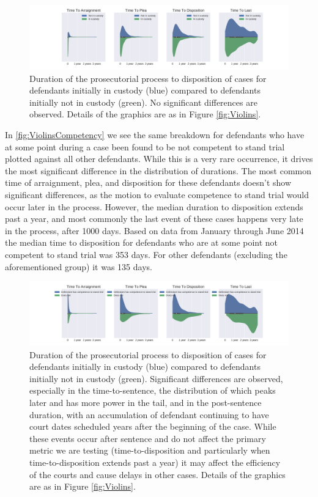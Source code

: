 \documentclass{AISB2008}
\begin{document}
\begin{figure}[h!]
\begin{center}
\includegraphics[width=0.70\columnwidth]{figures/4violins_custody/4violins_custody}
\caption{Duration of the prosecutorial process to disposition of cases for defendants initially in custody (blue) compared to defendants initially not in custody (green). No significant differences are observed. Details of the graphics are as in Figure \ref{fig:Violins}.
\label{fig:ViolinsCustody}%
}
\end{center}
\end{figure}

In \autoref{fig:ViolinsCompetency} we see the same breakdown for
defendants who have at some point during a case been found to be not
competent to stand trial plotted against all other defendants. While
this is a very rare occurrence,
it drives the most significant difference in the distribution of
durations. The most common time of arraignment, plea, and disposition
for these defendants doesn't show significant differences, as the
motion to evaluate competence to stand trial would occur later in the
process.  However, the median duration to disposition extends past a
year, and most commonly the last event of these cases happens very
late in the process, after 1000 days. Based on data from January
through June 2014 the median time to disposition for defendants who
are at some point not competent to stand trial was 353 days. For other
defendants (excluding the aforementioned group) it was 135 days.



\begin{figure}[h!]
\begin{center}
\includegraphics[width=0.70\columnwidth]{figures/4violins_pc1/4violins_pc1}
\caption{Duration of the prosecutorial process to disposition of cases for defendants initially in custody (blue) compared to defendants initially not in custody (green). Significant differences are observed, especially in the time-to-sentence, the distribution of which peaks later and has more power in the tail, and in the post-sentence duration, with an accumulation of defendant continuing to have court dates scheduled years after the beginning of the case. While these events occur after sentence and do not affect the primary metric we are testing (time-to-disposition and particularly when time-to-disposition extends past a year) it may affect the efficiency of the courts and cause delays in other cases. Details of the graphics are as in Figure \ref{fig:Violins}.
\label{fig:ViolinsCompetency}%
}
\end{center}
\end{figure}
\end{document}
